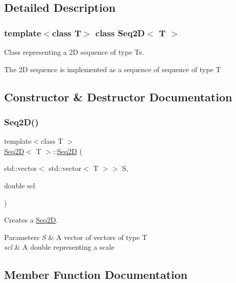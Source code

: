 \subsection{Detailed Description}
\subsubsection*{template$<$class T$>$\newline
class Seq2\+D$<$ T $>$}

Class representing a 2D sequence of type T\textquotesingle{}s. 

The 2D sequence is implemented as a sequence of sequence of type T 

\subsection{Constructor \& Destructor Documentation}
\mbox{\label{class_seq2_d_a3575add9a5feb2d1981eba9ee2c42512}} 
\subsubsection{\texorpdfstring{Seq2\+D()}{Seq2D()}}
{\footnotesize\ttfamily template$<$class T $>$ \\
\mbox{\hyperlink{class_seq2_d}{Seq2D}}$<$ T $>$\+::\mbox{\hyperlink{class_seq2_d}{Seq2D}} (\begin{DoxyParamCaption}\item[{std\+::vector$<$ std\+::vector$<$ T $>$$>$}]{S,  }\item[{double}]{scl }\end{DoxyParamCaption})}



Creates a \mbox{\hyperlink{class_seq2_d}{Seq2D}}. 


\begin{DoxyParams}{Parameters}
{\em S} & A vector of vectors of type T \\
\hline
{\em scl} & A double representing a scale \\
\hline
\end{DoxyParams}


\subsection{Member Function Documentation}
\mbox{\label{class_seq2_d_ac5131076ac848c7e2e1a6be678d4437b}} 
